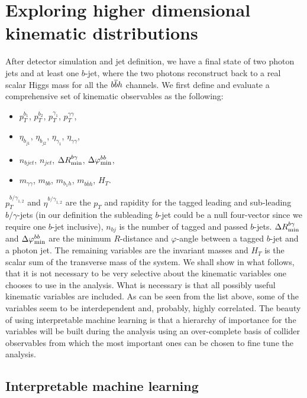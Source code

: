 \section{Exploring higher dimensional kinematic distributions}
\label{sec:kinematics}

After detector simulation and jet definition, we have a final state of two photon jets and at least one $b$-jet, where the two photons reconstruct back to a real scalar Higgs mass for all the $b\overline bh$ channels. We first define and evaluate a comprehensive set of kinematic observables as the following:
\begin{itemize}
	\setlength{\itemsep}{0pt}
	\item $p_T^{b_1}$, $p_T^{b_2}$, $p_T^{\gamma_1}$, $p_T^{\gamma\gamma}$, 
	\item $\eta_{b_{j1}}$, $\eta_{b_{j2}}$, $\eta_{\gamma_1}$, $\eta_{\gamma\gamma}$,
	\item $n_{bjet}$, $n_{jet}$, $\Delta R_{\rm min}^{b\gamma}$, $\Delta \varphi_{\rm min}^{bb}$, 
	\item $m_{\gamma\gamma}$, $m_{bb}$, $m_{b_{1} h}$, $m_{b\bar b h}$, $H_T$.
\end{itemize}
$p_T^{{b/\gamma}_{1,2}}$ and $\eta^{{b/\gamma}_{1,2}}$ are the $p_T$ and rapidity for the tagged leading and sub-leading $b/\gamma$-jets (in our definition the subleading $b$-jet could be a null four-vector since we require one $b$-jet inclusive), $n_{bj}$ is the number of tagged and passed $b$-jets. $\Delta R_{\rm min}^{b\gamma}$ and $\Delta \varphi_{\rm min}^{bb}$ are the minimum $R$-distance and $\varphi$-angle between a tagged $b$-jet and a photon jet. The remaining variables are the invariant masses and $H_T$ is the scalar sum of the transverse mass of the system. We shall show in what follows, that it is not necessary to be very selective about the kinematic variables one chooses to use in the analysis. What is necessary is that all possibly useful kinematic variables are included. As can be seen from the list above, some of the variables seem to be interdependent and, probably, highly correlated. The beauty of using interpretable machine learning is that a hierarchy of importance for the variables will be built during the analysis using an over-complete basis of collider observables from which the most important ones can be chosen to fine tune the analysis. 


\subsection{Interpretable machine learning}
\label{sec:BDT}

